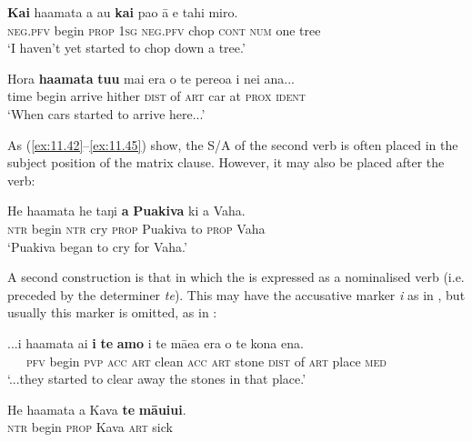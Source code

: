 \ea\label{ex:11.45}
\gll \textbf{Kai} ha{\ꞌ}amata a au \textbf{kai} pa{\ꞌ}o {\ꞌ}ā e tahi miro. \\
\textsc{neg.pfv} begin \textsc{prop} \textsc{1sg} \textsc{neg.pfv} chop \textsc{cont} \textsc{num} one tree \\

\glt 
‘I haven’t yet started to chop down a tree.’ \textstyleExampleref{[R363.091]} 
\z

\ea\label{ex:11.46}
\gll Hora \textbf{ha{\ꞌ}amata} \textbf{tu{\ꞌ}u} mai era o te pere{\ꞌ}oa {\ꞌ}i nei {\ꞌ}ana... \\
time begin arrive hither \textsc{dist} of \textsc{art} car at \textsc{prox} \textsc{ident} \\

\glt
‘When cars started to arrive here...’ \textstyleExampleref{[R539-2.145]}
\z

As (\ref{ex:11.42}–\ref{ex:11.45}) show, the S/A of the second verb is often placed in the subject position of the matrix clause. However, it may also be placed after the  verb:

\ea\label{ex:11.47}
\gll He ha{\ꞌ}amata he taŋi \textbf{a} \textbf{Puakiva} ki a Vaha. \\
\textsc{ntr} begin \textsc{ntr} cry \textsc{prop} Puakiva to \textsc{prop} Vaha \\

\glt 
‘Puakiva began to cry for Vaha.’ \textstyleExampleref{[R229.149]} 
\z

A second construction is that in which the  is expressed as a nominalised verb (i.e. preceded by the determiner \textit{te}). This  may have the accusative marker \textit{i} as in , but usually this marker is omitted, as in :

\ea\label{ex:11.48}
\gll ...i ha{\ꞌ}amata ai \textbf{i} \textbf{te} \textbf{amo} i te mā{\ꞌ}ea era o te kona ena. \\
~~~\textsc{pfv} begin \textsc{pvp} \textsc{acc} \textsc{art} clean \textsc{acc} \textsc{art} stone \textsc{dist} of \textsc{art} place \textsc{med} \\

\glt 
‘...they started to clear away the stones in that place.’ \textstyleExampleref{[R539-2.213]}
\z

\ea\label{ex:11.49}
\gll He ha{\ꞌ}amata a Kava \textbf{te} \textbf{māuiui}. \\
\textsc{ntr} begin \textsc{prop} Kava \textsc{art} sick \\

